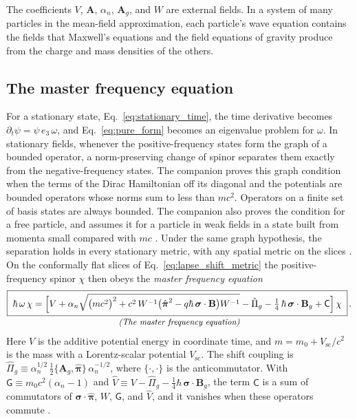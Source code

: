 \documentclass[aps,prd,onecolumn,tightenlines,nofootinbib,notitlepage,11pt,floatfix]{revtex4-2}
\theoremstyle{indentedtheorem}
\begin{document}
The coefficients $V$, $\mathbf{A}$, $\alpha_n$, $\mathbf{A}_g$, and $W$ are external fields. In a system of many particles in the mean-field approximation, each particle's wave equation contains the fields that Maxwell's equations and the field equations of gravity produce from the charge and mass densities of the others.

\subsection{The master frequency equation}
\label{sec:master}

For a stationary state, Eq.~\eqref{eq:stationary_time}, the time derivative becomes $\partial_t\psi=\psi\,e_3\,\omega$, and Eq.~\eqref{eq:pure_form} becomes an eigenvalue problem for $\omega$. In stationary fields, whenever the positive-frequency states form the graph of a bounded operator, a norm-preserving change of spinor separates them exactly from the negative-frequency states. The companion proves this graph condition when the terms of the Dirac Hamiltonian off its diagonal and the potentials are bounded operators whose norms sum to less than $mc^2$. Operators on a finite set of basis states are always bounded. The companion also proves the condition for a free particle, and assumes it for a particle in weak fields in a state built from momenta small compared with $mc$ \citep{HutchisonWavefn2026,Foldy1950Dirac,Eriksen1958Foldy}. Under the same graph hypothesis, the separation holds in every stationary metric, with any spatial metric on the slices \citep{HutchisonWavefn2026}. On the conformally flat slices of Eq.~\eqref{eq:lapse_shift_metric} the positive-frequency spinor $\chi$ then obeys the \emph{master frequency equation}
\begin{equation}
    \begin{gathered}
    \boxed{\;
    \hbar\,\omega \, \chi = \Big[V + \alpha_n\sqrt{\big(mc^2\big)^2 + c^2 \, W^{-1}\big(\hat{\boldsymbol{\pi}}^2 - q\hbar\,\boldsymbol{\sigma}\cdot\mathbf{B}\big)W^{-1}} - \hat{\Pi}_g - \tfrac{1}{4}\,\hbar\,\boldsymbol{\sigma}\cdot\mathbf{B}_g + \mathsf{C}\Big] \, \chi\;} \, . \\[-3pt]
    \text{\small\itshape (The master frequency equation)}
    \end{gathered}
    \label{eq:master}
\end{equation}
Here $V$ is the additive potential energy in coordinate time, and $m=m_0+V_\text{sc}/c^2$ is the mass with a Lorentz-scalar potential $V_\text{sc}$. The shift coupling is $\hat{\Pi}_g\equiv\alpha_n^{1/2}\,\tfrac{1}{2}\{\mathbf{A}_g,\hat{\boldsymbol{\pi}}\}\,\alpha_n^{-1/2}$, where $\{\cdot,\cdot\}$ is the anticommutator. With $\mathsf{G}\equiv m_0c^2(\alpha_n-1)$ and $\hat{V}\equiv V-\hat{\Pi}_g-\tfrac{1}{4}\hbar\,\boldsymbol{\sigma}\cdot\mathbf{B}_g$, the term $\mathsf{C}$ is a sum of commutators of $\boldsymbol{\sigma}\cdot\hat{\boldsymbol{\pi}}$, $W$, $\mathsf{G}$, and $\hat{V}$, and it vanishes when these operators commute \citep{HutchisonWavefn2026}.
\end{document}
